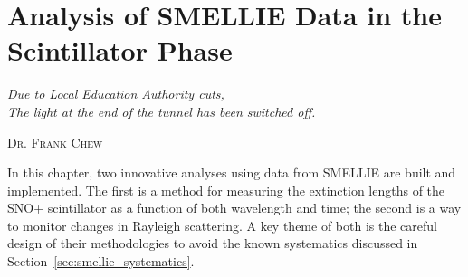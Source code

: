 \chapter{Analysis of SMELLIE Data in the Scintillator Phase}\label{chap:smellie_analysis}
\setlength{\epigraphwidth}{.5\textwidth}
\epigraph{\textit{Due to Local Education Authority cuts,\\The light at the end of the tunnel has been switched off.}}{\textsc{Dr. Frank Chew}}
\setlength{\epigraphwidth}{.4\textwidth}

In this chapter, two innovative analyses using data from SMELLIE are built and implemented. The first is a method for measuring the extinction lengths of the SNO+ scintillator as a function of both wavelength and time; the second is a way to monitor changes in Rayleigh scattering. A key theme of both is the careful design of their methodologies to avoid the known systematics discussed in Section~\ref{sec:smellie_systematics}.

